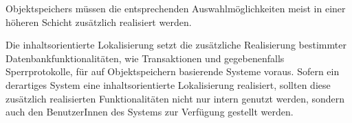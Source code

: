 Objektspeichers m\"{u}ssen die entsprechenden Auswahlm\"{o}glichkeiten meist
in einer h\"{o}heren Schicht zus\"{a}tzlich realisiert werden.
%
\par{}Die inhaltsorientierte Lokalisierung setzt die zus\"{a}tzliche
Realisierung bestimmter Datenbankfunktionalit\"{a}ten, wie Transaktionen
und gegebenenfalls Sperrprotokolle, f\"{u}r auf Objektspeichern basierende
Systeme voraus.  Sofern ein derartiges System eine inhaltsorientierte
Lokalisierung realisiert, sollten diese zus\"{a}tzlich realisierten
Funktionalit\"{a}ten nicht nur intern genutzt werden, sondern auch den
BenutzerInnen des Systems zur Verf\"{u}gung gestellt werden.
